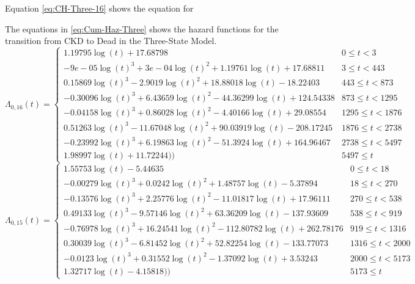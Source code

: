 \documentclass[12pt,PhD,twoside,openright]{muthesis}
\begin{document}
Equation \eqref{eq:CH-Three-16} shows the equation for

The equations in \eqref{eq:Cum-Haz-Three} shows the hazard functions for the transition from CKD to Dead in the Three-State Model.
\begin{equation}
\Lambda_{0,16}(t)=\begin{cases} 1.19795\log(t)+17.68798 & 0 \le t < 3 \\ -9e-05\log(t)^3+3e-04\log(t)^2+1.19761\log(t)+17.68811 & 3 \le t < 443 \\ 0.15869\log(t)^3-2.9019\log(t)^2+18.88018\log(t)-18.22403 & 443 \le t < 873 \\ -0.30096\log(t)^3+6.43659\log(t)^2-44.36299\log(t)+124.54338 & 873 \le t < 1295 \\ -0.04158\log(t)^3+0.86028\log(t)^2-4.40166\log(t)+29.08554 & 1295 \le t < 1876 \\ 0.51263\log(t)^3-11.67048\log(t)^2+90.03919\log(t)-208.17245 & 1876 \le t < 2738 \\ -0.23992\log(t)^3+6.19863\log(t)^2-51.3924\log(t)+164.96467 & 2738 \le t < 5497 \\ 1.98997\log(t)+11.72244)) & 5497 \le t \label{eq:CH-Three-16}\end{cases}
\end{equation}
\begin{equation}
\Lambda_{0,15}(t)=\begin{cases} 1.55753\log(t)-5.44635 & 0 \le t < 18 \\ -0.00279\log(t)^3+0.0242\log(t)^2+1.48757\log(t)-5.37894 & 18 \le t < 270 \\ -0.13576\log(t)^3+2.25776\log(t)^2-11.01817\log(t)+17.96111 & 270 \le t < 538 \\ 0.49133\log(t)^3-9.57146\log(t)^2+63.36209\log(t)-137.93609 & 538 \le t < 919 \\ -0.76978\log(t)^3+16.24541\log(t)^2-112.80782\log(t)+262.78176 & 919 \le t < 1316 \\ 0.30039\log(t)^3-6.81452\log(t)^2+52.82254\log(t)-133.77073 & 1316 \le t < 2000 \\ -0.0123\log(t)^3+0.31552\log(t)^2-1.37092\log(t)+3.53243 & 2000 \le t < 5173 \\ 1.32717\log(t)-4.15818)) & 5173 \le t \label{eq:CH-Three-15}\end{cases}
\end{equation}
\end{document}
